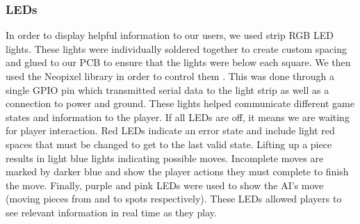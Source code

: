 \documentclass[11pt,journal]{IEEEtran}
\begin{document}
\subsubsection{LEDs}
In order to display helpful information to our users, we used strip RGB LED lights. These lights were individually soldered together to create custom spacing and glued to our PCB to ensure that the lights were below each square. We then used the Neopixel library in order to control them \cite{neopixel}. This was done through a single GPIO pin which transmitted serial data to the light strip as well as a connection to power and ground. These lights helped communicate different game states and information to the player. If all LEDs are off, it means we are waiting for player interaction. Red LEDs indicate an error state and include light red spaces that must be changed to get to the last valid state. Lifting up a piece results in light blue lights indicating possible moves. Incomplete moves are marked by darker blue and show the player actions they must complete to finish the move. Finally, purple and pink LEDs were used to show the AI's move (moving pieces from and to spots respectively). These LEDs allowed players to see relevant information in real time as they play.
\end{document}
